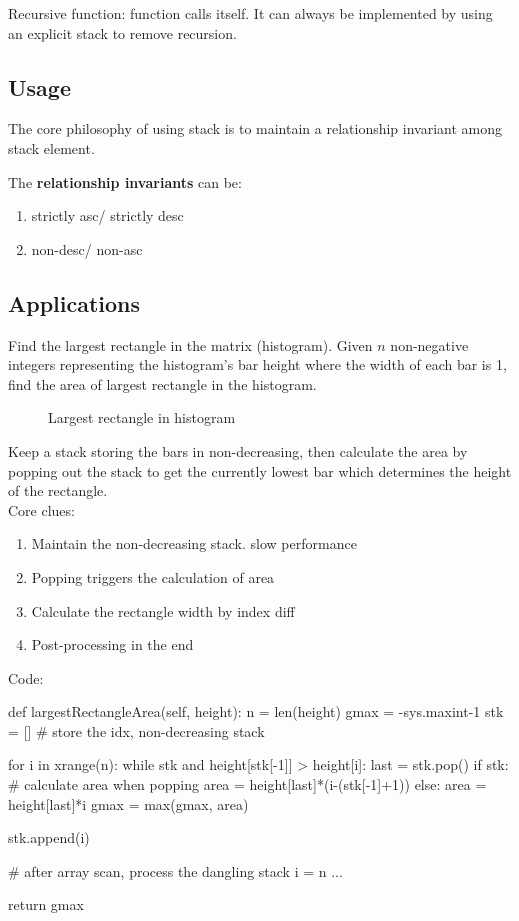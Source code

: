 Recursive function: function calls itself. It can always be implemented by using an explicit stack to remove recursion. 

\subsection{Usage}
The core philosophy of using stack is to maintain a relationship invariant among stack element. 

The \textbf{relationship invariants} can be:
\begin{enumerate}
\item strictly asc/ strictly desc
\item non-desc/ non-asc
\end{enumerate}

\subsection{Applications}
 Find the largest rectangle in the matrix (histogram). Given $n$ non-negative integers representing the histogram's bar height where the width of each bar is 1, find the area of largest rectangle in the histogram. 

\begin{figure}[hbtp]
\centering
{}
\caption{Largest rectangle in histogram}
\label{fig:histogram_area}
\end{figure}

Keep a stack storing the bars in non-decreasing, then calculate the area by popping out the stack to get the currently lowest bar which determines the height of the rectangle.
\\
Core clues:
\begin{enumerate}
\item Maintain the non-decreasing stack. slow performance 
\item Popping triggers the calculation of area
\item Calculate the rectangle width by index diff
\item Post-processing in the end
\end{enumerate}
\newpage
Code:
\begin{python}
def largestRectangleArea(self, height):
    n = len(height)
    gmax = -sys.maxint-1
    stk = []  # store the idx, non-decreasing stack

    for i in xrange(n):
        while stk and height[stk[-1]] > height[i]:
            last = stk.pop()
            if stk:  # calculate area when popping
                area = height[last]*(i-(stk[-1]+1))
            else:
                area = height[last]*i
            gmax = max(gmax, area)

        stk.append(i)

    # after array scan, process the dangling stack
    i = n
    ...

    return gmax
\end{python}


